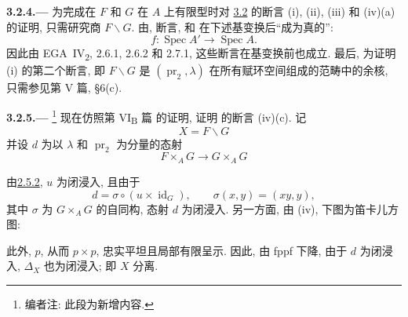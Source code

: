 
\medskip
{}\label{par:sga3-VIA-3.2.4}%
\noindent\textbf{3.2.4.---}
为完成在 \(F\) 和 \(G\) 在 \(A\) 上有限型时对
\hyperref[thm:sga3-VIA-3.2]{3.2} 的断言 (i), (ii), (iii) 和 (iv)(a) 的证明,
只需研究商 \(F\backslash G\).
由,
断言,
和
在下述基变换后``成为真的'':
\[
  f:\operatorname{Spec}A'\longrightarrow\operatorname{Spec}A.
\]
因此由 EGA~IV\textsubscript{2}, 2.6.1, 2.6.2 和 2.7.1,
这些断言在基变换前也成立.
最后, 为证明 (i) 的第二个断言, 即 \(F\backslash G\)
是 \((\operatorname{pr}_2,\lambda)\) 在所有赋环空间组成的范畴中的余核,
只需参见第 V 篇, \S6(c).

\medskip
{}\label{par:sga3-VIA-3.2.5}%
\noindent\textbf{3.2.5.---}%
\footnote{\label{note:sga3-VIA-41}编者注: 此段为新增内容.}
现在仿照第 VI\textsubscript{B} 篇 的证明,
证明 的断言 (iv)(c). 记
\[
  X=F\backslash G
\]
并设 \(d\) 为以 \(\lambda\) 和 \(\operatorname{pr}_2\) 为分量的态射
\[
  F\times_A G\longrightarrow G\times_A G
\]


由\hyperref[prop:sga3-VIA-2.5.2]{2.5.2}, \(u\) 为闭浸入, 且由于
\[
  d=\sigma\circ(u\times\operatorname{id}_G),
  \qquad
  \sigma(x,y)=(xy,y),
\]
其中 \(\sigma\) 为 \(G\times_A G\) 的自同构, 态射 \(d\) 为闭浸入.
另一方面, 由 (iv), 下图为笛卡儿方图:
\begin{center}
  \label{diag:sga3-VIA-3.2.5-cartesian-square}%
\end{center}
此外, \(p\), 从而 \(p\times p\), 忠实平坦且局部有限呈示.
因此, 由 fppf 下降, 由于 \(d\) 为闭浸入, \(\Delta_X\) 也为闭浸入;
即 \(X\) 分离.
